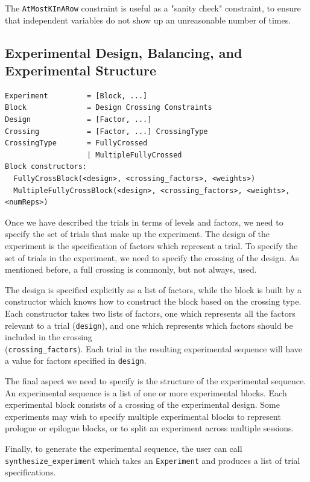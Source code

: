 The \texttt{AtMostKInARow} constraint is useful as a "sanity check" constraint, to ensure that independent variables do not show up an unreasonable number of times.

\subsection{Experimental Design, Balancing, and Experimental Structure}

\begin{verbatim}
Experiment         = [Block, ...]
Block              = Design Crossing Constraints
Design             = [Factor, ...]
Crossing           = [Factor, ...] CrossingType
CrossingType       = FullyCrossed
                   | MultipleFullyCrossed
Block constructors:
  FullyCrossBlock(<design>, <crossing_factors>, <weights>)
  MultipleFullyCrossBlock(<design>, <crossing_factors>, <weights>, <numReps>)
\end{verbatim}

Once we have described the trials in terms of levels and factors, we need to specify the set of trials that make up the experiment. The design of the experiment is the specification of factors which represent a trial. To specify the set of trials in the experiment, we need to specify the crossing of the design. As mentioned before, a full crossing is commonly, but not always, used.

The design is specified explicitly as a list of factors, while the block is built by a constructor which knows how to construct the block based on the crossing type. Each constructor takes two lists of factors, one which represents all the factors relevant to a trial (\texttt{design}), and one which represents which factors should be included in the crossing\\(\texttt{crossing\_factors}). Each trial in the resulting experimental sequence will have a value for factors specified in \texttt{design}.

The final aspect we need to specify is the structure of the experimental sequence. An experimental sequence is a list of one or more experimental blocks. Each experimental block consists of a crossing of the experimental design. Some experiments may wish to specify multiple experimental blocks to represent prologue or epilogue blocks, or to split an experiment across multiple sessions.

Finally, to generate the experimental sequence, the user can call \texttt{synthesize\_experiment} which takes an \texttt{Experiment} and produces a list of trial specifications.

